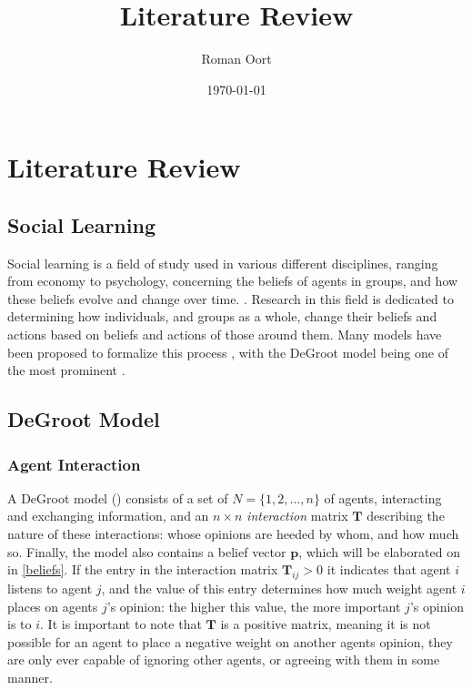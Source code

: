 \documentclass{article}
\title{Literature Review}
\author{Roman Oort}
\date{\today}
\newcommand{\T}{\textbf{T}}
\newcommand{\Tij}{\textbf{T}_{ij}}
\begin{document}
\maketitle

\tableofcontents

\newpage

\section{Literature Review}
\subsection{Social Learning}
Social learning is a field of study used in various different disciplines, ranging from economy to psychology, concerning the beliefs of agents in groups, and how these beliefs evolve and change over time. \cite{reed2010sociallearning}. Research in this field is dedicated to determining how individuals, and groups as a whole, change their beliefs and actions based on beliefs and actions of those around them. Many models have been proposed to formalize this process \cite{golub2017learning}, with the DeGroot model being one of the most prominent \cite{degroot1974concensus}.

\subsection{DeGroot Model}
\subsubsection{Agent Interaction}
A DeGroot model (\cite{degroot1974concensus}) consists of a set of $N=\{1, 2, ..., n\}$ of agents, interacting and exchanging information, and an $n \times n$ \emph{interaction} matrix $\T$ describing the nature of these interactions: whose opinions are heeded by whom, and how much so. Finally, the model also contains a belief vector $\textbf{p}$, which will be elaborated on in \ref{beliefs}. If the entry in the interaction matrix $\Tij > 0$ it indicates that agent $i$ listens to agent $j$, and the value of this entry determines how much weight agent $i$ places on agents $j$'s opinion: the higher this value, the more important $j$'s opinion is to $i$. It is important to note that $\T$ is a positive matrix, meaning it is not possible for an agent to place a negative weight on another agents opinion, they are only ever capable of ignoring other agents, or agreeing with them in some manner. 
\end{document}
